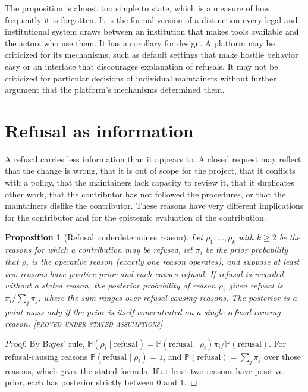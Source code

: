 \documentclass[11pt,twoside,openright]{book}
\theoremstyle{plain}
\newtheorem{proposition}[theorem]{Proposition}
\theoremstyle{definition}
\theoremstyle{remark}
\newcommand{\Proved}{\textup{\textsc{[proved under stated assumptions]}}}
\newcommand{\Prob}{\mathbb{P}}
\begin{document}
The proposition is almost too simple to state, which is a measure of how frequently it is forgotten. It is the formal version of a distinction every legal and institutional system draws between an institution that makes tools available and the actors who use them. It has a corollary for design. A platform may be criticized for its mechanisms, such as default settings that make hostile behavior easy or an interface that discourages explanation of refusals. It may not be criticized for particular decisions of individual maintainers without further argument that the platform's mechanisms determined them.

\section{Refusal as information}

A refusal carries less information than it appears to. A closed request may reflect that the change is wrong, that it is out of scope for the project, that it conflicts with a policy, that the maintainers lack capacity to review it, that it duplicates other work, that the contributor has not followed the procedures, or that the maintainers dislike the contributor. These reasons have very different implications for the contributor and for the epistemic evaluation of the contribution.

\begin{proposition}[Refusal underdetermines reason]\label{prop:refusal}
Let $\rho_1,\dots,\rho_k$ with $k\ge2$ be the reasons for which a contribution may be refused, let $\pi_i$ be the prior probability that $\rho_i$ is the operative reason (exactly one reason operates), and suppose at least two reasons have positive prior and each causes refusal. If refusal is recorded without a stated reason, the posterior probability of reason $\rho_i$ given refusal is $\pi_i/\sum_{j}\pi_j$, where the sum ranges over refusal-causing reasons. The posterior is a point mass only if the prior is itself concentrated on a single refusal-causing reason.
\Proved{}
\end{proposition}

\begin{proof}
By Bayes' rule, $\Prob(\rho_i\mid\text{refusal})=\Prob(\text{refusal}\mid\rho_i)\pi_i/\Prob(\text{refusal})$. For refusal-causing reasons $\Prob(\text{refusal}\mid\rho_i)=1$, and $\Prob(\text{refusal})=\sum_j\pi_j$ over those reasons, which gives the stated formula. If at least two reasons have positive prior, each has posterior strictly between $0$ and $1$.
\end{proof}
\end{document}
